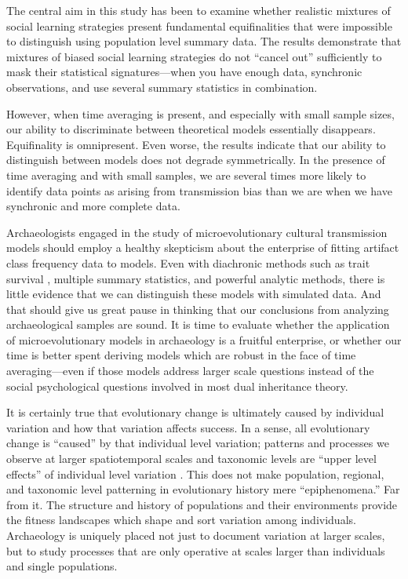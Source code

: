 The central aim in this study has been to examine whether realistic mixtures of social learning strategies present fundamental equifinalities that were impossible to distinguish using population level summary data.  The results demonstrate that mixtures of biased social learning strategies do not ``cancel out'' sufficiently to mask their statistical signatures---when you have enough data, synchronic observations, and use several summary statistics in combination.  

However, when time averaging is present, and especially with small sample sizes, our ability to discriminate between theoretical models essentially disappears.  Equifinality is omnipresent.  Even worse, the results indicate that our ability to distinguish between models does not degrade symmetrically.  In the presence of time averaging and with small samples, we are several times more likely to identify data points as arising from transmission bias than we are when we have synchronic and more complete data.  

Archaeologists engaged in the study of microevolutionary cultural transmission models should employ a healthy skepticism about the enterprise of fitting artifact class frequency data to models.  Even with diachronic methods such as trait survival \citep{Kandler2013}, multiple summary statistics, and powerful analytic methods, there is little evidence that we can distinguish these models with simulated data.  And that should give us great pause in thinking that our conclusions from analyzing archaeological samples are sound.  It is time to evaluate whether the application of microevolutionary models in archaeology is a fruitful enterprise, or whether our time is better spent deriving models which are robust in the face of time averaging---even if those models address larger scale questions instead of the social psychological questions involved in most dual inheritance theory.  

It is certainly true that evolutionary change is ultimately caused by individual variation and how that variation affects success.   In a sense, all evolutionary change is ``caused'' by that individual level variation; patterns and processes we observe at larger spatiotemporal scales and taxonomic levels are ``upper level effects'' of individual level variation \citep{walsh2019paradox}.  This does not make population, regional, and taxonomic level patterning in evolutionary history mere ``epiphenomena.''  Far from it.  The structure and history of populations and their environments provide the fitness landscapes which shape and sort variation among individuals.  Archaeology is uniquely placed not just to document variation at larger scales, but to study processes that are only operative at scales larger than individuals and single populations.


